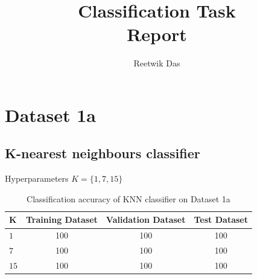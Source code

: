 \documentclass[11pt]{article}
\title{Classification Task\\
Report}
\author{Reetwik Das}
\begin{document}
\maketitle
\newpage
\tableofcontents
\listoftables
\listoffigures

\newpage 

\section{Dataset 1a}
\subsection{K-nearest neighbours classifier}
Hyperparameters $K = \{1,7,15\}$
\begin{table}[h!]
\label{tab:tab1.1.1}
\begin{center}
\begin{tabular}{|l|c|c|c|}
\hline
\textbf{K } & \textbf{Training Dataset} & \textbf{Validation Dataset} &\textbf{Test Dataset}\\
\hline
$1$ & 100 & 100 & 100\\
\hline
$7$ & 100 & 100 & 100\\
\hline
$15$ & 100 & 100 & 100\\
\hline
\end{tabular}
\caption{Classification accuracy of KNN classifier on Dataset 1a}
\end{center}
\end{table}
\end{document}
